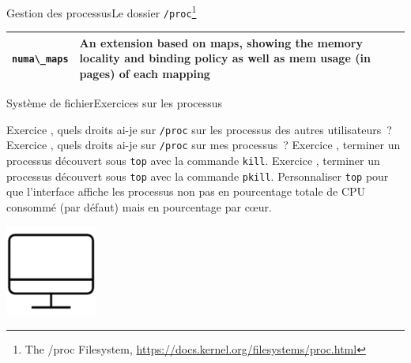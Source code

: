 \documentclass{beamer}
\begin{document}
\begin{frame}{Gestion des processus}{Le dossier \lstinline{/proc}\footnote{The /proc Filesystem, \url{https://docs.kernel.org/filesystems/proc.html}}}
\begin{footnotesize}
\begin{tiny}
\begin{table}[h!]
\begin{tabular}{|p{2cm}|p{8cm}|}
                        \hline
                        \lstinline{numa\_maps}    & An extension based on maps, showing the memory locality and binding policy as well as mem usage (in pages) of each mapping      \\
                        \hline
                    \end{tabular}
                \end{table}
            \end{tiny}
        \end{footnotesize}
    \end{frame}

    \begin{frame}{Système de fichier}{Exercices sur les processus}
        \begin{small}
            Exercice \execcounterdispinc{}, quels droits ai-je sur \lstinline{/proc} sur les processus des autres utilisateurs~?
            \bigbreak
            Exercice \execcounterdispinc{}, quels droits ai-je sur \lstinline{/proc} sur mes processus~?
            \bigbreak
            Exercice \execcounterdispinc{}, terminer un processus découvert sous \lstinline{top} avec la commande \lstinline{kill}.
            \bigbreak
            Exercice \execcounterdispinc{}, terminer un processus découvert sous \lstinline{top} avec la commande \lstinline{pkill}.
            \bigbreak
            Personnaliser \lstinline{top} pour que l'interface affiche les processus non pas en pourcentage totale de CPU consommé (par défaut) mais en pourcentage par cœur.
        \end{small}
        \begin{center}
            \includegraphics[width=3cm]{image/desktop}
        \end{center}
    \end{frame}
\end{document}
